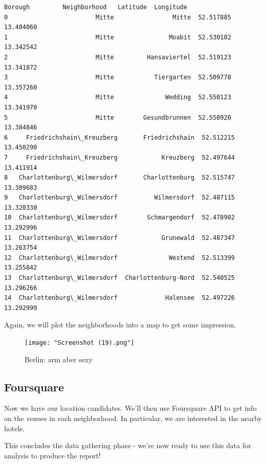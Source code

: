 \documentclass[11pt]{article}
\makeatletter
\newcommand{\boxspacing}{\kern\kvtcb@left@rule\kern\kvtcb@boxsep}
\newcommand{\prompt}[4]{
        {\ttfamily\llap{{\color{#2}[#3]:\hspace{3pt}#4}}\vspace{-\baselineskip}}
    }
\makeatother
\begin{document}
                \begin{tcolorbox}[breakable, size=fbox, boxrule=.5pt, pad at break*=1mm, opacityfill=0]
\begin{Verbatim}[commandchars=\\\{\}]
                       Borough         Neighborhood   Latitude  Longitude
0                        Mitte                Mitte  52.517885  13.404060
1                        Mitte               Moabit  52.530102  13.342542
2                        Mitte         Hansaviertel  52.519123  13.341872
3                        Mitte           Tiergarten  52.509778  13.357260
4                        Mitte              Wedding  52.550123  13.341970
5                        Mitte        Gesundbrunnen  52.550920  13.384846
6     Friedrichshain\_Kreuzberg       Friedrichshain  52.512215  13.450290
7     Friedrichshain\_Kreuzberg            Kreuzberg  52.497644  13.411914
8   Charlottenburg\_Wilmersdorf       Charlottenburg  52.515747  13.309683
9   Charlottenburg\_Wilmersdorf          Wilmersdorf  52.487115  13.320330
10  Charlottenburg\_Wilmersdorf        Schmargendorf  52.478902  13.292996
11  Charlottenburg\_Wilmersdorf            Grunewald  52.487347  13.263754
12  Charlottenburg\_Wilmersdorf              Westend  52.513399  13.255842
13  Charlottenburg\_Wilmersdorf  Charlottenburg-Nord  52.540525  13.296266
14  Charlottenburg\_Wilmersdorf             Halensee  52.497226  13.292999
\end{Verbatim}
\end{tcolorbox}
        
    Again, we will plot the neighborhoods into a map to get some impression.

    \begin{figure}
\centering
\texttt{[image: "Screenshot (19).png"]}
\caption{Berlin: arm aber sexy}
\end{figure}


        
    \hypertarget{foursquare}{%
\subsection{Foursquare}\label{foursquare}}

Now we have our location candidates. We'll then use Foursquare API to
get info on the venues in each neighborhood. In particular, we are
interested in the nearby hotels.


        
    This concludes the data gathering phase - we're now ready to use this
data for analysis to produce the report!
\end{document}
